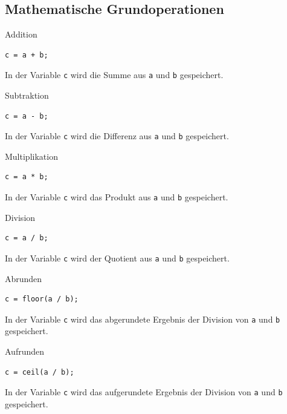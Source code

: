 \documentclass[12pt, a4paper, twoside]{article}
\begin{document}
        \subsection{Mathematische Grundoperationen}
            \begin{CodeErklaerungBox}{Addition}
                \begin{lstlisting}
c = a + b;
                \end{lstlisting}
                \tcblower
                In der Variable \texttt{c} wird die Summe aus \texttt{a} und \texttt{b} gespeichert.
                \end{CodeErklaerungBox}
                \begin{CodeErklaerungBox}{Subtraktion}
                \begin{lstlisting}
c = a - b;
                \end{lstlisting}
                \tcblower
                In der Variable \texttt{c} wird die Differenz aus \texttt{a} und \texttt{b} gespeichert.
                \end{CodeErklaerungBox}
                \begin{CodeErklaerungBox}{Multiplikation}
                \begin{lstlisting}
c = a * b;
                \end{lstlisting}
                \tcblower
                In der Variable \texttt{c} wird das Produkt aus \texttt{a} und \texttt{b} gespeichert.
                \end{CodeErklaerungBox}
                \begin{CodeErklaerungBox}{Division}
                \begin{lstlisting}
c = a / b;
                \end{lstlisting}
                \tcblower
                In der Variable \texttt{c} wird der Quotient aus \texttt{a} und \texttt{b} gespeichert.
                \end{CodeErklaerungBox}
                \begin{CodeErklaerungBox}{Abrunden}
                \begin{lstlisting}
c = floor(a / b);
                \end{lstlisting}
                \tcblower
                In der Variable \texttt{c} wird das abgerundete Ergebnis der Division von \texttt{a} und \texttt{b} gespeichert.
                \end{CodeErklaerungBox}
                \begin{CodeErklaerungBox}{Aufrunden}
                \begin{lstlisting}
c = ceil(a / b);
                \end{lstlisting}
                \tcblower
                In der Variable \texttt{c} wird das aufgerundete Ergebnis der Division von \texttt{a} und \texttt{b} gespeichert.
                \end{CodeErklaerungBox}
\end{document}
